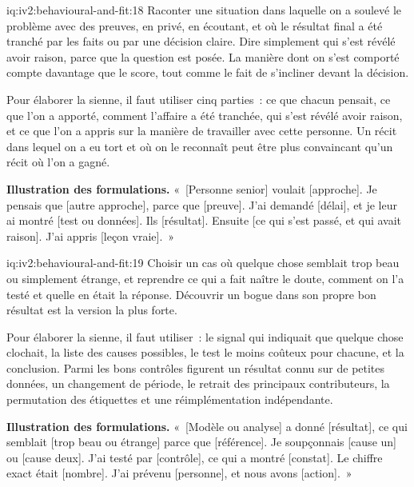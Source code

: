 \begin{solution}{iq:iv2:behavioural-and-fit:18}
Raconter une situation dans laquelle on a soulevé le problème avec des preuves, en privé, en écoutant, et où le résultat final a été tranché par les faits ou par une décision claire. Dire simplement qui s'est révélé avoir raison, parce que la question est posée. La manière dont on s'est comporté compte davantage que le score, tout comme le fait de s'incliner devant la décision.

Pour élaborer la sienne, il faut utiliser cinq parties~: ce que chacun pensait, ce que l'on a apporté, comment l'affaire a été tranchée, qui s'est révélé avoir raison, et ce que l'on a appris sur la manière de travailler avec cette personne. Un récit dans lequel on a eu tort et où on le reconnaît peut être plus convaincant qu'un récit où l'on a gagné.

\textbf{Illustration des formulations.} «~[Personne senior] voulait [approche]. Je pensais que [autre approche], parce que [preuve]. J'ai demandé [délai], et je leur ai montré [test ou données]. Ils [résultat]. Ensuite [ce qui s'est passé, et qui avait raison]. J'ai appris [leçon vraie].~»

\end{solution}

\begin{solution}{iq:iv2:behavioural-and-fit:19}
Choisir un cas où quelque chose semblait trop beau ou simplement étrange, et reprendre ce qui a fait naître le doute, comment on l'a testé et quelle en était la réponse. Découvrir un bogue dans son propre bon résultat est la version la plus forte.

Pour élaborer la sienne, il faut utiliser~: le signal qui indiquait que quelque chose clochait, la liste des causes possibles, le test le moins coûteux pour chacune, et la conclusion. Parmi les bons contrôles figurent un résultat connu sur de petites données, un changement de période, le retrait des principaux contributeurs, la permutation des étiquettes et une réimplémentation indépendante.

\textbf{Illustration des formulations.} «~[Modèle ou analyse] a donné [résultat], ce qui semblait [trop beau ou étrange] parce que [référence]. Je soupçonnais [cause un] ou [cause deux]. J'ai testé par [contrôle], ce qui a montré [constat]. Le chiffre exact était [nombre]. J'ai prévenu [personne], et nous avons [action].~»

\end{solution}


